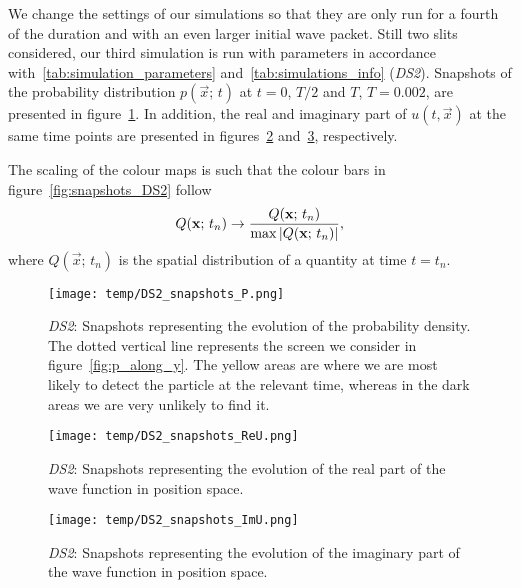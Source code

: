     We change the settings of our simulations so that they are only run for a fourth of the duration and with an even larger initial wave packet. Still two slits considered, our third simulation is run with parameters in accordance with~\ref{tab:simulation_parameters} and~\ref{tab:simulations_info} (\textit{DS2}). Snapshots of the probability distribution $p(\vec{x};\, t)$ at $t=0$, $T/2$ and $T$, $T=0.002$, are presented in figure~\ref{fig:snapshots_p_DS2}. In addition, the real and imaginary part of $u(t, \vec{x})$ at the same time points are presented in figures~\ref{fig:snapshots_ReU_DS2} and~\ref{fig:snapshots_ImU_DS2}, respectively.

    The scaling of the colour maps is such that the colour bars in figure~\ref{fig:snapshots_DS2} follow
    \begin{equation}\label{eq:normalisation_cmaps}
        Q(\mathbf{x};\, t_n) \to \frac{Q(\mathbf{x};\, t_n)}{\max{\abs{Q(\mathbf{x};\, t_n)}}},
    \end{equation}
    where $Q(\vec{x};\, t_n)$ is the spatial distribution of a quantity at time $t=t_n$. 

    \begin{figure*}
        \centering
        \begin{subfigure}{0.96\textwidth}
            \texttt{[image: temp/DS2\_snapshots\_P.png]}
            \caption{\textit{DS2}: Snapshots representing the evolution of the probability density. The dotted vertical line represents the screen we consider in figure~\ref{fig:p_along_y}. The yellow areas are where we are most likely to detect the particle at the relevant time, whereas in the dark areas we are very unlikely to find it.}
            \label{fig:snapshots_p_DS2}
        \end{subfigure}
        \hfill
        \begin{subfigure}{0.96\textwidth}
            \texttt{[image: temp/DS2\_snapshots\_ReU.png]}
            \caption{\textit{DS2}: Snapshots representing the evolution of the real part of the wave function in position space. }
            \label{fig:snapshots_ReU_DS2}
        \end{subfigure}
        \hfill
        \begin{subfigure}{0.96\textwidth}
            \texttt{[image: temp/DS2\_snapshots\_ImU.png]}
            \caption{\textit{DS2}: Snapshots representing the evolution of the imaginary part of the wave function in position space.}
            \label{fig:snapshots_ImU_DS2}
        \end{subfigure}
        \caption{Colour maps showing the solution of the Schrödinger equation for the \textit{DS2} setup at times $t=0.000,\, 0.001, \,0.002$. The walls that set up the slits are illustrated by the green rectangles. Each map have been scaled using the absolute maximum of the quantity at the current time point. }
        \label{fig:snapshots_DS2}
    \end{figure*}



